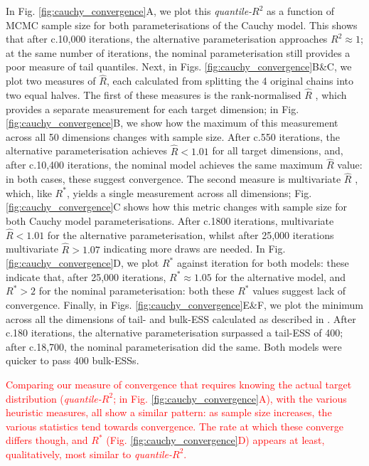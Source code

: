 \documentclass{article}
\begin{document}
In Fig. \ref{fig:cauchy_convergence}A, we plot this \textit{quantile-$R^2$} as a function of MCMC sample size for both parameterisations of the Cauchy model. This shows that after c.10,000 iterations, the alternative parameterisation approaches $R^2\approx 1$; at the same number of iterations, the nominal parameterisation still provides a poor measure of tail quantiles. Next, in Figs. \ref{fig:cauchy_convergence}B\&C, we plot two measures of $\widehat{R}$, each calculated from splitting the 4 original chains into two equal halves. The first of these measures is the rank-normalised $\widehat{R}$ \citep{vehtari2019rank}, which provides a separate measurement for each target dimension; in Fig. \ref{fig:cauchy_convergence}B, we show how the maximum of this measurement across all 50 dimensions changes with sample size. After c.550 iterations, the alternative parameterisation achieves $\widehat{R}<1.01$ for all target dimensions, and, after c.10,400 iterations, the nominal model achieves the same maximum $\widehat{R}$ value: in both cases, these suggest convergence. The second measure is multivariate $\widehat{R}$ \citep{brooks1998general}, which, like $R^*$, yields a single measurement across all dimensions; Fig. \ref{fig:cauchy_convergence}C shows how this metric changes with sample size for both Cauchy model parameterisations. After c.1800 iterations, multivariate $\widehat{R}<1.01$ for the alternative parameterisation, whilst after 25,000 iterations multivariate $\widehat{R}>1.07$ indicating more draws are needed. In Fig. \ref{fig:cauchy_convergence}D, we plot $R^*$ against iteration for both models: these indicate that, after 25,000 iterations, $R^*\approx 1.05$ for the alternative model, and $R^*>2$ for the nominal parameterisation: both these $R^*$ values suggest lack of convergence. Finally, in Figs. \ref{fig:cauchy_convergence}E\&F, we plot the minimum across all the dimensions of tail- and bulk-ESS calculated as described in \cite{vehtari2019rank}. After c.180 iterations, the alternative parameterisation surpassed a tail-ESS of 400; after c.18,700, the nominal parameterisation did the same. Both models were quicker to pass 400 bulk-ESSs.

\textcolor{red}{Comparing our measure of convergence that requires knowing the actual target distribution (\textit{quantile-$R^2$}; in Fig. \ref{fig:cauchy_convergence}A), with the various heuristic measures, all show a similar pattern: as sample size increases, the various statistics tend towards convergence. The rate at which these converge differs though, and $R^*$ (Fig. \ref{fig:cauchy_convergence}D) appears at least, qualitatively, most similar to \textit{quantile-$R^2$}.}
\end{document}
